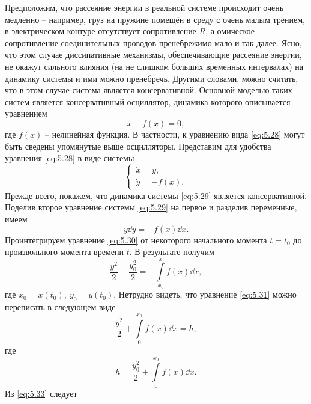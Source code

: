 Предположим, что рассеяние энергии в реальной системе происходит
очень медленно – например, груз на пружине помещён в среду с очень малым
трением, в электрическом контуре отсутствует сопротивление $R$, а омическое
сопротивление соединительных проводов пренебрежимо мало и так далее.
Ясно, что этом случае диссипативные механизмы, обеспечивающие рассеяние
энергии, не окажут сильного влияния (на не слишком больших временных
интервалах) на динамику системы и ими можно пренебречь. Другими словами,
можно считать, что в этом случае система является консервативной. Основной
моделью таких систем является консервативный осциллятор, динамика
которого описывается уравнением
\begin{equation}
        \label{eq:5.28}
        \ddot x + f(x) = 0,
\end{equation}
где $f(x)$ -- нелинейная функция. В частности, к уравнению вида \eqref{eq:5.28} могут быть сведены упомянутые выше осцилляторы. Представим для удобства уравнения \eqref{eq:5.28} в виде системы
\begin{equation}
        \label{eq:5.29}
        \begin{cases}
                \dot x = y, \\
                \dot y = -f(x).
        \end{cases}
\end{equation}
Прежде всего, покажем, что динамика системы \eqref{eq:5.29} является консервативной. Поделив второе уравнение системы \eqref{eq:5.29} на первое и разделив переменные, имеем
\begin{equation}
        \label{eq:5.30}
        y \dd{y} = - f(x) \dd{x}.
\end{equation}
Проинтегрируем уравнение \eqref{eq:5.30} от некоторого начального момента $t=t_0$ до произвольного момента времени $t$. В результате получим
\begin{equation}
        \label{eq:5.31}
        \frac{y^2}{2} - \frac{y_0^2}{2} = - \int\limits_{x_0}^{x} f(x) \dd{x}, 
\end{equation}
где $x_0 = x(t_0),~ y_0=y(t_0)$. Нетрудно видеть, что уравнение \eqref{eq:5.31} можно переписать в следующем виде
\begin{equation}
        \label{eq:5.32}
        \frac{y^2}{2} + \int\limits_{0}^{x_0} f(x) \dd{x} = h, 
\end{equation}
где
\begin{equation}
        \label{eq:5.33}
        h=\frac{y_0^2}{2} + \int\limits_{0}^{x_0}  f(x) \dd{x}.
\end{equation}
Из \eqref{eq:5.33} следует

